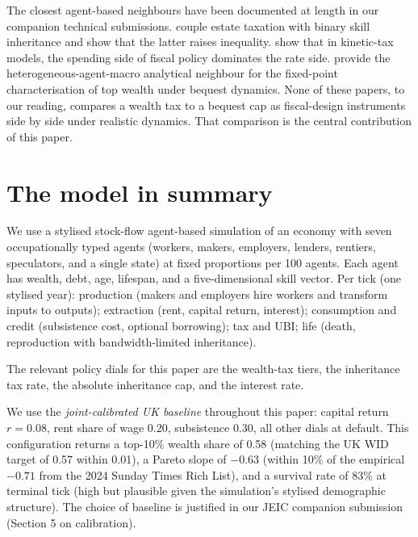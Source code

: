 \documentclass[11pt]{article}
\begin{document}
The closest agent-based neighbours have been documented at length
in our companion technical submissions.  \citet{spangler2022distribution}
couple estate taxation with binary skill inheritance and show that
the latter raises inequality.  \citet{cardoso2025wealth} show that
in kinetic-tax models, the spending side of fiscal policy dominates
the rate side.  \citet{benhabib2011distribution} provide the
heterogeneous-agent-macro analytical neighbour for the
fixed-point characterisation of top wealth under bequest dynamics.
None of these papers, to our reading, compares a wealth tax to a
bequest cap as fiscal-design instruments side by side under
realistic dynamics.  That comparison is the central contribution
of this paper.

\section{The model in summary}
\label{sec:model}

We use a stylised stock-flow agent-based simulation of an economy
with seven occupationally typed agents (workers, makers, employers,
lenders, rentiers, speculators, and a single state) at fixed
proportions per 100 agents.  Each agent has wealth, debt, age,
lifespan, and a five-dimensional skill vector.  Per tick (one
stylised year): production (makers and employers hire workers and
transform inputs to outputs); extraction (rent, capital return,
interest); consumption and credit (subsistence cost, optional
borrowing); tax and UBI; life (death, reproduction with
bandwidth-limited inheritance).

The relevant policy dials for this paper are the wealth-tax tiers,
the inheritance tax rate, the absolute inheritance cap, and the
interest rate.

We use the \emph{joint-calibrated UK baseline} throughout this
paper: capital return $r = 0.08$, rent share of wage $0.20$,
subsistence $0.30$, all other dials at default.  This configuration
returns a top-10\% wealth share of 0.58 (matching the UK WID
target of 0.57 within 0.01), a Pareto slope of $-0.63$ (within 10\%
of the empirical $-0.71$ from the 2024 Sunday Times Rich List), and
a survival rate of 83\% at terminal tick (high but plausible given
the simulation's stylised demographic structure).  The choice of
baseline is justified in our JEIC companion submission
(Section 5 on calibration).
\end{document}
